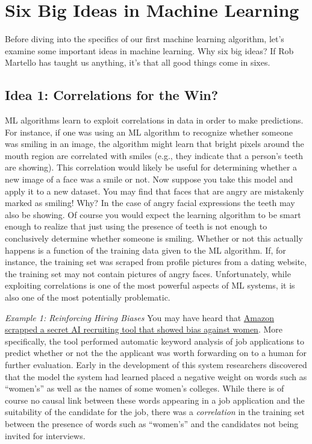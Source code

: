\documentclass[assignment01_Solutions]{subfiles}
\begin{document}
\section{Six Big Ideas in Machine Learning}
Before diving into the specifics of our first machine learning algorithm, let's examine some important ideas in machine learning.  Why six big ideas?  If Rob Martello has taught us anything, it's that all good things come in sixes.


\subsection*{Idea 1: Correlations for the Win?}
ML algorithms learn to exploit correlations in data in order to make predictions.  For instance, if one was using an ML algorithm to recognize whether someone was smiling in an image, the algorithm might learn that bright pixels around the mouth region are correlated with smiles (e.g., they indicate that a person's teeth are showing).  This correlation would likely be useful for determining whether a new image of a face was a smile or not.  Now suppose you take this model and apply it to a new dataset.  You may find that faces that are angry are mistakenly marked as smiling!  Why?  In the case of angry facial expressions the teeth may also be showing.  Of course you would expect the learning algorithm to be smart enough to realize that just using the presence of teeth is not enough to conclusively determine whether someone is smiling.  Whether or not this actually happens is a function of the training data given to the ML algorithm.  If, for instance, the training set was scraped from profile pictures from a dating website, the training set may not contain pictures of angry faces.  Unfortunately, while exploiting correlations is one of the most powerful aspects of ML systems, it is also one of the most potentially problematic.


\bi

\item \emph{Example 1: Reinforcing Hiring Biases}
You may have heard that \href{https://www.reuters.com/article/us-amazon-com-jobs-automation-insight/amazon-scraps-secret-ai-recruiting-tool-that-showed-bias-against-women-idUSKCN1MK08G}{Amazon scrapped a secret AI recruiting tool that showed bias against women}.  More specifically, the tool performed automatic keyword analysis of job applications to predict whether or not the the applicant was worth forwarding on to a human for further evaluation.  Early in the development of this system researchers discovered that the model the system had learned placed a negative weight on words such as ``women's'' as well as the names of some women's colleges.  While there is of course no causal link between these words appearing in a job application and the suitability of the candidate for the job, there was a \emph{correlation} in the training set between the presence of words such as ``women's'' and the candidates not being invited for interviews.
\end{document}
